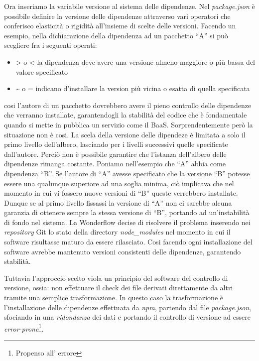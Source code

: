 Ora inseriamo la variabile versione al sistema delle dipendenze. Nel
\textit{package.json} è possibile definire la versione delle dipendenze
attraverso vari operatori che conferisco elasticità o rigidità all'insieme di
scelte delle versioni. Facendo un esempio, nella dichiarazione della dipendenza
ad un pacchetto ``A'' si può scegliere fra i seguenti operati:
\begin{itemize}
  \item > o < la dipendenza deve avere una versione almeno maggiore o più bassa
  del valore specificato
  \item \~{} o = indicano d'installare la version più vicina o esatta di quella
  specificata
\end{itemize}
cosi l'autore di un pacchetto dovrebbero avere il pieno controllo delle
dipendenze che verranno installate, garantendogli la stabilità del codice che è
fondamentale quando si mette in pubblica un servizio come il \gls{BaaS}.
Sorprendentemente però la situazione non è cosi. La scela della versione delle
dipendeze è limitata a solo il primo livello dell'albero, lasciando per i
livelli successivi quelle specificate dall'autore. Perciò non è possibile
garantire che l'istanza dell'albero delle dipendenze rimanga costante.
Poniamo nell'esempio che ``A'' abbia come dipendenza ``B''. Se l'autore di ``A''
avesse specificato che la versione ``B'' potesse essere una qualunque superiore
ad una soglia minima, ciò implicava che nel momento in cui vi fossero nuove
versioni di ``B'' queste verrebbero installate. Dunque se al primo livello
fissassi la versione di ``A'' non ci sarebbe alcuna garanzia di ottenere sempre
la stessa versione di ``B'', portando ad un'instabilità di fondo nel sistema.
La Wonderflow decise di risolvere il problema inserendo nei \textit{repository}
Git lo stato della directory \textit{node\_modules} nel momento in cui il
software risultasse maturo da essere rilasciato. Cosi facendo ogni installazione
del software avrebbe mantenuto versioni consistenti delle dipendenze, garantendo
stabilità.

Tuttavia l'approccio scelto viola un principio del software del controllo di
versione, ossia: non effettuare il \gls{check} dei file derivati direttamente da
altri tramite una semplice trasformazione. In questo caso la trasformazione è
l'installazione delle dipendenze effettuata da \textit{npm}, partendo dal file
\textit{package.json}, sfociando in una \textit{ridondanza} dei dati e portando
il controllo di versione ad essere \textit{error-prone}\footnote{Propenso all'
errore}.

